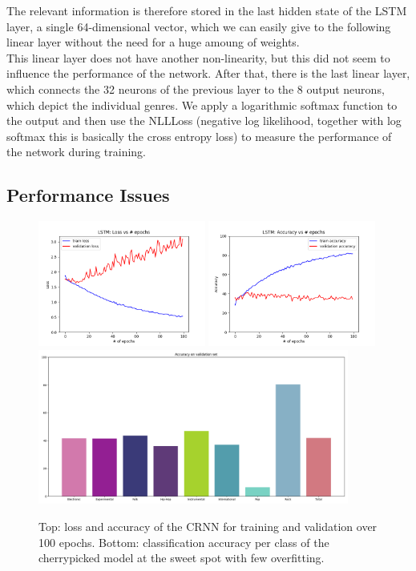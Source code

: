     The relevant information is therefore stored in the last hidden state of the LSTM layer, a single 64-dimensional vector, which we can easily give to the following linear layer without the need for a huge amoung of weights.\\
    This linear layer does not have another non-linearity, but this did not seem to influence the performance of the network.
    After that, there is the last linear layer, which connects the 32 neurons of the previous layer to the 8 output neurons, which depict the individual genres.
    We apply a logarithmic softmax function to the output and then use the NLLLoss (negative log likelihood, together with log softmax this is basically the cross entropy loss) to measure the performance of the network during training.\\

    \subsection{Performance Issues}

    \begin{figure}[t]
        \centering
        \includegraphics[width=0.49\textwidth]{images/loss}
        \includegraphics[width=0.49\textwidth]{images/acc}
        \includegraphics[width=0.91\textwidth]{images/val_acc}
        \caption{Top: loss and accuracy of the CRNN for training and validation over 100 epochs. Bottom: classification accuracy per class of the cherrypicked model at the sweet spot with few overfitting.}
        \label{performance}
    \end{figure}

